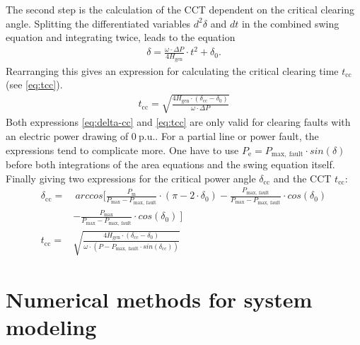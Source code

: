 The second step is the calculation of the \acs{CCT} dependent on the critical clearing angle. Splitting the differentiated variables $d^2\delta$ and $dt$ in the combined swing equation and integrating twice, leads to the equation
\begin{align}
        \delta=\frac{\omega \cdot \Delta P}{4 H_\mathrm{gen}} \cdot t^2 + \delta_\mathrm{0}. \nonumber
\end{align}
Rearranging this gives an expression for calculating the critical clearing time $t_\mathrm{cc}$ (see \autoref{eq:tcc}).
\begin{align}
        t_\mathrm{cc}=\sqrt{\frac{4 H_\mathrm{gen} \cdot (\delta_\mathrm{cc}-\delta_\mathrm{0})}{\omega \cdot \Delta P}} \label{eq:tcc}
\end{align}
Both expressions \autoref{eq:delta-cc} and \autoref{eq:tcc} are only valid for clearing faults with an electric power drawing of $0~\mathrm{p.u.}$. For a partial line or power fault, the expressions tend to complicate more. One have to use $P_\mathrm{e}=P_\mathrm{max,~fault} \cdot sin(\delta)$ before both integrations of the area equations and the swing equation itself. Finally giving two expressions for the critical power angle $\delta_\mathrm{cc}$ and the \acs{CCT} $t_\mathrm{cc}$:
\begin{align}
        \delta_\mathrm{cc}=&~arccos\Bigg[\frac{P_\mathrm{m}}{P_\mathrm{max}-P_\mathrm{max,~fault}} \cdot (\pi-2 \cdot \delta_\mathrm{0})-\frac{P_\mathrm{max,~fault}}{P_\mathrm{max}-P_\mathrm{max,~fault}} \cdot cos(\delta_\mathrm{0}) \nonumber \\& - \frac{P_\mathrm{max}}{P_\mathrm{max}-P_\mathrm{max,~fault}} \cdot cos(\delta_\mathrm{0})~\Bigg] \label{eq:delta-cc-adv} \\[12pt]
        t_\mathrm{cc}=&\sqrt{\frac{4 H_\mathrm{gen} \cdot (\delta_\mathrm{cc}-\delta_\mathrm{0})}{\omega \cdot (P-P_\mathrm{max,~fault} \cdot sin(\delta_\mathrm{cc}))}} \label{eq:tcc-adv}
\end{align}

\section{Numerical methods for system modeling}
\label{sec:numerical-methods}


